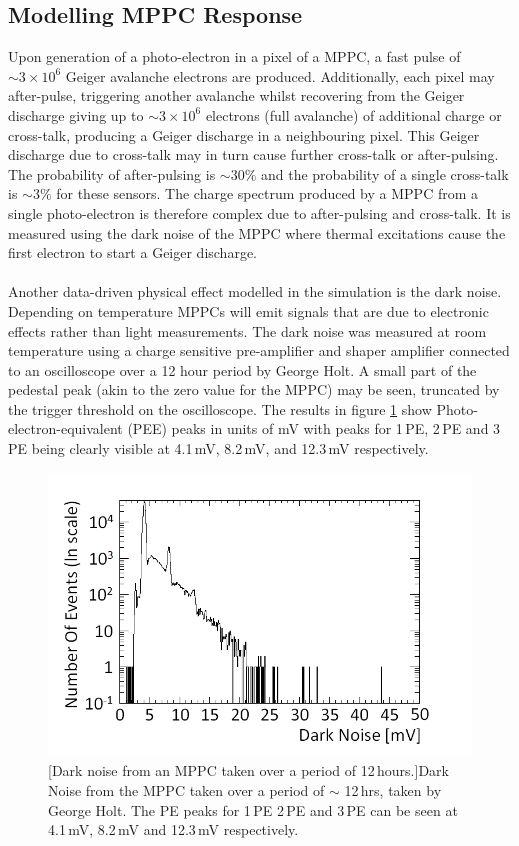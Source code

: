 \subsection{Modelling MPPC Response}\label{sec:GEANT4Simulation_ModellingDarkNoise}
Upon generation of a photo-electron in a pixel of a MPPC, a fast pulse of $\sim 3 \times 10^6$ Geiger avalanche electrons are produced. Additionally, each pixel may after-pulse, triggering another avalanche  whilst recovering
from the Geiger discharge giving up to $\sim 3 \times 10^6$ electrons (full avalanche)  of additional charge or cross-talk, producing a Geiger discharge in a neighbouring pixel. This Geiger discharge due to cross-talk may in turn cause further cross-talk or after-pulsing. The probability of after-pulsing is $\sim 30 \%$ and the probability of a single cross-talk is $\sim 3 \%$ for these sensors. The charge spectrum produced by a MPPC from a single photo-electron is therefore complex due to after-pulsing and cross-talk. It is measured using the dark noise of the MPPC where thermal excitations cause the first electron to start a Geiger discharge.
\\\\Another data-driven physical effect modelled in the simulation is the dark noise. Depending on temperature MPPCs will emit signals that are due to electronic effects rather than light measurements. The dark noise was measured at room temperature using a charge sensitive pre-amplifier and shaper amplifier connected to an oscilloscope  over a 12 hour period by George Holt. A small part of the pedestal peak (akin to the zero value for the MPPC) may be seen, truncated by the trigger threshold on the oscilloscope. The results in figure \ref{fig:pureDarkNoise} show Photo-electron-equivalent (PEE) peaks in units of mV with peaks for 1\,PE, 2\,PE and 3\,PE being clearly visible at 4.1\,mV, 8.2\,mV, and 12.3\,mV respectively. 
\begin{figure}[!h]
 \centering
 \includegraphics[width=0.7\linewidth]{Chapter4/Figs/Raster/pureDarkNoise_outputMedText.png}
 [Dark noise from an MPPC taken over a period of 12\,hours.]{Dark Noise from the MPPC taken over a period of $\sim$ 12\,hrs, taken by George Holt. The PE peaks for 1\,PE 2\,PE and 3\,PE can be seen at 4.1\,mV, 8.2\,mV and 12.3\,mV respectively. } 
 \label{fig:pureDarkNoise}
\end{figure}
